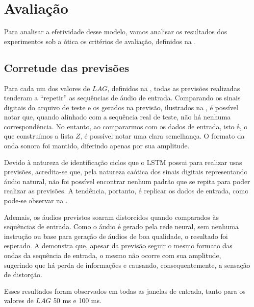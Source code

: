 \section{Avaliação}

Para analisar a efetividade desse modelo, vamos analisar os resultados dos experimentos sob a ótica os critérios de avaliação, definidos na .

\subsection{Corretude das previsões}

Para cada um dos valores de $LAG$, definidos na , todas as previsões realizadas tenderam a ``repetir'' as sequências de áudio de entrada. Comparando os sinais digitais do arquivo de teste e os gerados na previsão, ilustrados na , é possível notar que, quando alinhado com a sequência real de teste, não há nenhuma correspondência. No entanto, ao compararmos com os dados de entrada, isto é, o que construímos a lista $Z$, é possível notar uma clara semelhança. O formato da onda sonora foi mantido, diferindo apenas por sua amplitude.

Devido à natureza de identificação ciclos que o LSTM possui para realizar usas previsões, acredita-se que, pela natureza caótica dos sinais digitais representando áudio natural, não foi possível encontrar nenhum padrão que se repita para poder realizar as previsões. A tendência, portanto, é replicar os dados de entrada, como pode-se observar na .

Ademais, os áudios previstos soaram distorcidos quando comparados às sequências de entrada. Como o áudio é gerado pela rede neural, sem nenhuma instrução ou base para geração de áudios de boa qualidade, o resultado foi esperado. A  demonstra que, apesar da previsão seguir o mesmo formato das ondas da sequência de entrada, o mesmo não ocorre com sua amplitude, sugerindo que há perda de informações e causando, consequentemente, a sensação de distorção. 

Esses resultados foram observados em todas as janelas de entrada, tanto para os valores de $LAG$ 50 ms e 100 ms.

